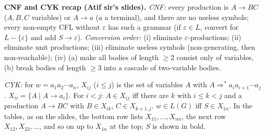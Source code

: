 \documentclass[11pt,a4paper]{article}
\newcommand{\eps}{\varepsilon}
\begin{document}
\begin{note}\textbf{CNF and CYK recap (Atif sir's slides).} \emph{CNF:} every production is $A\to BC$ ($A,B,C$ variables) or $A\to a$ ($a$ a terminal), and there are no useless symbols; every non-empty CFL without $\eps$ has such a grammar (if $\eps\in L$, convert for $L-\{\eps\}$ and add $S\to\eps$). \emph{Conversion order:} (i) eliminate $\eps$-productions; (ii) eliminate unit productions; (iii) eliminate useless symbols (non-generating, then non-reachable); (iv) (a) make all bodies of length $\ge2$ consist only of variables, (b) break bodies of length $\ge3$ into a cascade of two-variable bodies.

\emph{CYK:} for $w=a_1a_2\cdots a_n$, $X_{ij}$ ($i\le j$) is the set of variables $A$ with $A\Rightarrow^*a_ia_{i+1}\cdots a_j$. $X_{ii}=\{A\mid A\to a_i\}$. For $i<j$: $A\in X_{ij}$ iff there are $k$ with $i\le k<j$ and a production $A\to BC$ with $B\in X_{ik}$, $C\in X_{k+1,j}$. $w\in L(G)$ iff $S\in X_{1n}$. In the tables, as on the slides, the bottom row lists $X_{11},\dots,X_{nn}$, the next row $X_{12},X_{23},\dots$, and so on up to $X_{1n}$ at the top; $S$ is shown in bold.\end{note}
\end{document}
